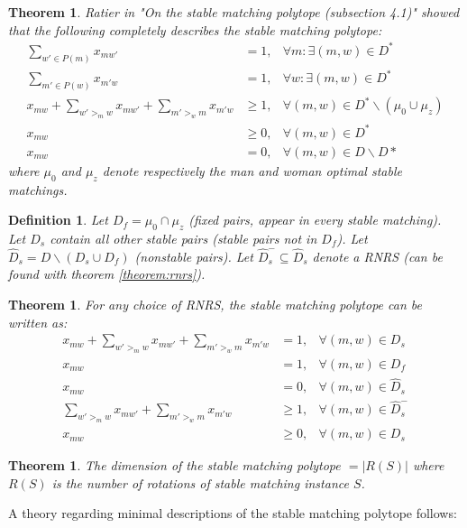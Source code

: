 \documentclass{article}
\newtheorem{theorem}[fact]{Theorem}
\newtheorem{definition}[fact]{Definition}
\begin{document}
\begin{theorem}
Ratier in "On the stable matching polytope (subsection 4.1)" showed that the following completely describes the stable matching polytope:
\begin{align}
\sum_{w' \in P(m)} x_{mw'} &= 1, &\forall m : \exists (m,w) \in D^*\\
\sum_{m' \in P(w)} x_{m'w} &=1, &\forall w: \exists (m,w) \in D^* \\
x_{mw} + \sum_{w' >_m w} x_{mw'} + \sum_{m'>_w m} x_{m'w} &\geq 1, &\forall (m,w) \in D^* \backslash(\mu_0 \cup \mu_z) \\
x_{mw} &\geq 0, &\forall (m,w) \in D^* \\
x_{mw} &= 0, &\forall (m,w) \in D\backslash D*
\end{align}
where $\mu_0$ and $\mu_z$ denote respectively the man and woman optimal stable matchings.
\end{theorem}
\begin{definition}
Let $D_f = \mu_0 \cap \mu_z$ (fixed pairs, appear in every stable matching). Let $D_s$ contain all other stable pairs (stable pairs not in $D_f$). Let $\hat{D}_s = D \backslash (D_s \cup D_f)$ (nonstable pairs). Let $\hat{D}^-_s \subseteq \hat{D}_s$ denote a RNRS (can be found with theorem \ref{theorem:rnrs}).
\end{definition}
\begin{theorem}
For any choice of RNRS, the stable matching polytope can be written as:
\begin{align}
x_{mw} + \sum_{w' >_m w} x_{mw'} + \sum_{m' >_w m} x_{m'w} &= 1, &\forall (m,w) \in D_s \\
x_{mw} &= 1, &\forall (m,w) \in D_f \\
x_{mw} &= 0, &\forall (m,w) \in \hat{D}_s \\
\sum_{w' >_m w} x_{mw'} + \sum_{m' >_w m} x_{m'w} &\geq 1, &\forall (m,w) \in \hat{D}^-_s \\
x_{mw} &\geq 0, &\forall (m,w) \in D_s
\end{align}
\end{theorem}
\begin{theorem}
The dimension of the stable matching polytope $= |R(S)|$ where $R(S)$ is the number of rotations of stable matching instance $S$.
\end{theorem}

A theory regarding minimal descriptions of the stable matching polytope follows:
\end{document}
